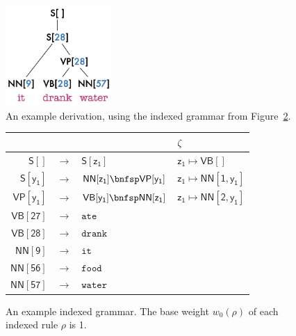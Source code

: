 \documentclass[11pt]{article}
\renewcommand{\bnfpn}[1]{\mathsf{#1}}
\renewcommand{\bnfpo}{\rightarrow}
\renewcommand{\bnfts}[1]{\mathtt{#1}}
\begin{document}
\begin{figure}[t]
\centering
\includegraphics[width=0.36\textwidth]{images/derivation2.png}
\caption{An example derivation, using the indexed grammar from Figure~\ref{fig:indexed_grammar}.}
\label{fig:derivation}
\end{figure}


\begin{figure}
\begin{tabular}{rcl|l} 
&&&$\zeta$\\
\hline \hline
$\bnfpn{S[]}$ &$\bnfpo$& $\bnfpn{S[z_1]}$ & $\bnfpn{z_1} \mapsto \bnfpn{VB[]}$ \\
$\bnfpn{S[y_1]}$ &$\bnfpo$& $\bnfpn{NN[z_1]} \bnfsp \bnfpn{VP[y_1]}$ &  $\bnfpn{z_1} \mapsto \bnfpn{NN[1, y_1]}$\\
$\bnfpn{VP[y_1]}$ &$\bnfpo$& $\bnfpn{VB[y_1]} \bnfsp \bnfpn{NN[z_1]}$ &  $\bnfpn{z_1} \mapsto \bnfpn{NN[2, y_1]}$\\
$\bnfpn{VB[27]}$ &$\bnfpo$& $\bnfts{ate}$ & \\
$\bnfpn{VB[28]}$ &$\bnfpo$& $\bnfts{drank}$ & \\
$\bnfpn{NN[9]}$ &$\bnfpo$& $\bnfts{it}$ & \\
$\bnfpn{NN[56]}$ &$\bnfpo$& $\bnfts{food}$ & \\
$\bnfpn{NN[57]}$ &$\bnfpo$& $\bnfts{water}$ & 
\end{tabular}
\caption{An example indexed grammar. The base weight $w_0(\rho)$ of each indexed rule $\rho$ is 1.\label{fig:indexed_grammar}}
\end{figure}
\end{document}
